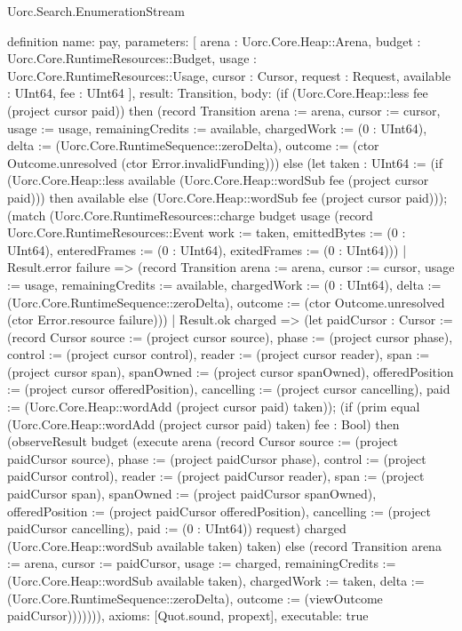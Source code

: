 \begin{lexlean}{Uorc.Search.EnumerationStream}
\begin{semanticmodule}
definition{
  name: pay,
  parameters: [
    arena : Uorc.Core.Heap::Arena,
    budget : Uorc.Core.RuntimeResources::Budget,
    usage : Uorc.Core.RuntimeResources::Usage,
    cursor : Cursor,
    request : Request,
    available : UInt64,
    fee : UInt64
  ],
  result: Transition,
  body: (if (Uorc.Core.Heap::less fee (project cursor paid)) then (record Transition {arena := arena, cursor := cursor, usage := usage, remainingCredits := available, chargedWork := (0 : UInt64), delta := (Uorc.Core.RuntimeSequence::zeroDelta), outcome := (ctor Outcome.unresolved (ctor Error.invalidFunding))}) else (let taken : UInt64 := (if (Uorc.Core.Heap::less available (Uorc.Core.Heap::wordSub fee (project cursor paid))) then available else (Uorc.Core.Heap::wordSub fee (project cursor paid))); (match (Uorc.Core.RuntimeResources::charge budget usage (record Uorc.Core.RuntimeResources::Event {work := taken, emittedBytes := (0 : UInt64), enteredFrames := (0 : UInt64), exitedFrames := (0 : UInt64)}))
    | Result.error failure => (record Transition {arena := arena, cursor := cursor, usage := usage, remainingCredits := available, chargedWork := (0 : UInt64), delta := (Uorc.Core.RuntimeSequence::zeroDelta), outcome := (ctor Outcome.unresolved (ctor Error.resource failure))})
    | Result.ok charged => (let paidCursor : Cursor := (record Cursor {source := (project cursor source), phase := (project cursor phase), control := (project cursor control), reader := (project cursor reader), span := (project cursor span), spanOwned := (project cursor spanOwned), offeredPosition := (project cursor offeredPosition), cancelling := (project cursor cancelling), paid := (Uorc.Core.Heap::wordAdd (project cursor paid) taken)}); (if (prim equal (Uorc.Core.Heap::wordAdd (project cursor paid) taken) fee : Bool) then (observeResult budget (execute arena (record Cursor {source := (project paidCursor source), phase := (project paidCursor phase), control := (project paidCursor control), reader := (project paidCursor reader), span := (project paidCursor span), spanOwned := (project paidCursor spanOwned), offeredPosition := (project paidCursor offeredPosition), cancelling := (project paidCursor cancelling), paid := (0 : UInt64)}) request) charged (Uorc.Core.Heap::wordSub available taken) taken) else (record Transition {arena := arena, cursor := paidCursor, usage := charged, remainingCredits := (Uorc.Core.Heap::wordSub available taken), chargedWork := taken, delta := (Uorc.Core.RuntimeSequence::zeroDelta), outcome := (viewOutcome paidCursor)})))))),
  axioms: [Quot.sound, propext],
  executable: true
}


\end{semanticmodule}
\end{lexlean}
